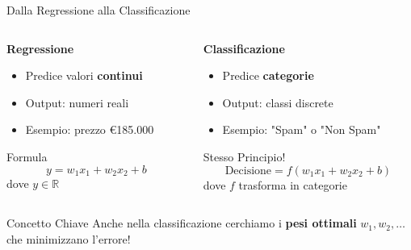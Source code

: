 \documentclass[aspectratio=169]{beamer}
\begin{document}
\begin{frame}{Dalla Regressione alla Classificazione}
\begin{columns}
\begin{column}{0.45\textwidth}
\textbf{Regressione}
\begin{itemize}
    \item Predice valori \textbf{continui}
    \item Output: numeri reali
    \item Esempio: prezzo €185.000
\end{itemize}

\vspace{0.3cm}

\begin{block}{Formula}
$$y = w_1 x_1 + w_2 x_2 + b$$
dove $y \in \mathbb{R}$
\end{block}
\end{column}

\begin{column}{0.45\textwidth}
\textbf{Classificazione}
\begin{itemize}
    \item Predice \textbf{categorie}
    \item Output: classi discrete
    \item Esempio: "Spam" o "Non Spam"
\end{itemize}

\vspace{0.3cm}

\begin{block}{Stesso Principio!}
$$\text{Decisione} = f(w_1 x_1 + w_2 x_2 + b)$$
dove $f$ trasforma in categorie
\end{block}
\end{column}
\end{columns}

\vspace{0.5cm}

\begin{alertblock}{Concetto Chiave}
Anche nella classificazione cerchiamo i \textbf{pesi ottimali} $w_1, w_2, \ldots$ che minimizzano l'errore!
\end{alertblock}
\end{frame}
%
%
\end{document}
